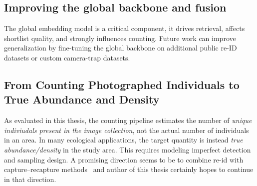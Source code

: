 \subsection{Improving the global backbone and fusion}

The global embedding model is a critical component, it drives retrieval,
 affects shortlist quality, and strongly influences counting. Future work can improve generalization by 
 fine-tuning the global backbone on additional public re-ID datasets or custom camera-trap datasets. 

 \subsection{From Counting Photographed Individuals to True Abundance and Density}
 As evaluated in this thesis, the counting pipeline estimates the number of \emph{unique indiviudals present in the image collection}, not the actual number of individuals in an area. In many ecological applications, the target quantity is instead \emph{true abundance/density} in the study area. This requires modeling imperfect detection and sampling design. A promising direction seems to be to combine re-id with capture--recapture methods~\cite{https://doi.org/10.1890/12-0413.1}\cite{https://doi.org/10.1111/j.0030-1299.2004.13043.x} and author of this thesis certainly hopes to continue in that direction. 
